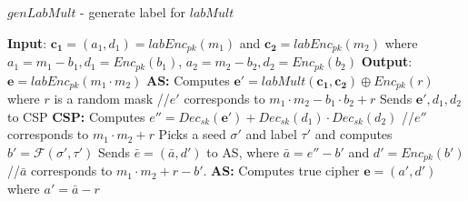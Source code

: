 \begin{algorithm}[b]
\caption{$genLabMult$ - generate label for $labMult$}\label{algo:genlabmult}
\small
\begin{algorithmic}[1]
\STATEx
\textbf{Input}: $\mathbf{c_1}=(a_1,d_1)=labEnc_{pk}(m_1)$ and $\mathbf{c_2}=labEnc_{pk}(m_2)$ 
\STATEx where $a_1= m_1-b_1, d_1=Enc_{pk}(b_1)$, $a_2= m_2-b_2, d_2=Enc_{pk}(b_2)$
\STATEx \textbf{Output}: $\mathbf{e}=labEnc_{pk}(m_1\cdot m_2)$
\STATEx \textbf{\textsf{AS}:} 
\STATE Computes $\textbf{e}'=labMult(\mathbf{c_1,c_2}) \oplus Enc_{pk}(r)$ where $r$ is a random mask 
\STATEx  //$e'$ corresponds to $m_1\cdot m_2-b_1\cdot b_2+r$
\STATE Sends $\mathbf{e'},d_1,d_2$ to \textsf{CSP}
\STATEx \textbf{\textsf{CSP}:}
\STATE Computes $e''= Dec_{sk}(\mathbf{e'}) + Dec_{sk}(d_1)\cdot Dec_{sk}(d_2)$
\STATEx //$e''$ corresponds to $m_1\cdot m_2 + r$ 
\STATE Picks a seed $\sigma'$ and label $\tau'$ and computes $b'=\mathcal{F}(\sigma',\tau')$ 
\STATE Sends $\bar{e}=(\bar{a},d')$ to \textsf{AS}, where $\bar{a} = e''-b'$ and $d' = Enc_{pk}(b')$
\STATEx //$\bar{a}$ corresponds to $m_1\cdot m_2 + r-b'$.
\STATEx \textbf{\textsf{AS}:}
\STATE Computes true cipher $\mathbf{e}=(a',d')$ where $a'=\bar{a}-r$ %
 \end{algorithmic}
\end{algorithm}

